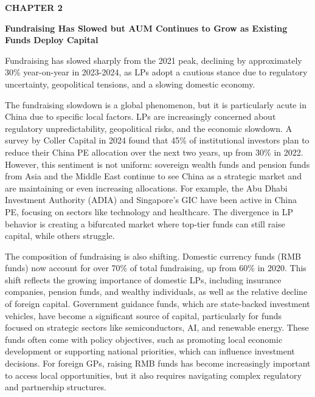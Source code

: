 \documentclass[10pt,a4paper]{article}
\begin{document}
\clearpage
\label{chap:2}
{\textcolor{BOBlue}{\scriptsize\bfseries CHAPTER 2}}\par\vspace{-1pt}
{\Large\sffamily\bfseries\color{BONavy} Fundraising Has Slowed but AUM Continues to Grow as Existing Funds Deploy Capital}\par\vspace{4pt}
{\textcolor{BOBlue}{\normalsize Fundraising has slowed sharply from the 2021 peak, declining by approximately 30\% year-on-year in 2023-2024, as LPs adopt a cautious stance due to regulatory uncertainty, geopolitical tensions, and a slowing domestic economy.}}\par\vspace{3pt}
\begin{minipage}[t]{0.58\linewidth}
{\small The fundraising slowdown is a global phenomenon, but it is particularly acute in China due to specific local factors. LPs are increasingly concerned about regulatory unpredictability, geopolitical risks, and the economic slowdown. A survey by Coller Capital in 2024 found that 45\% of institutional investors plan to reduce their China PE allocation over the next two years, up from 30\% in 2022. However, this sentiment is not uniform: sovereign wealth funds and pension funds from Asia and the Middle East continue to see China as a strategic market and are maintaining or even increasing allocations. For example, the Abu Dhabi Investment Authority (ADIA) and Singapore's GIC have been active in China PE, focusing on sectors like technology and healthcare. The divergence in LP behavior is creating a bifurcated market where top-tier funds can still raise capital, while others struggle.}\par
{\small The composition of fundraising is also shifting. Domestic currency funds (RMB funds) now account for over 70\% of total fundraising, up from 60\% in 2020. This shift reflects the growing importance of domestic LPs, including insurance companies, pension funds, and wealthy individuals, as well as the relative decline of foreign capital. Government guidance funds, which are state-backed investment vehicles, have become a significant source of capital, particularly for funds focused on strategic sectors like semiconductors, AI, and renewable energy. These funds often come with policy objectives, such as promoting local economic development or supporting national priorities, which can influence investment decisions. For foreign GPs, raising RMB funds has become increasingly important to access local opportunities, but it also requires navigating complex regulatory and partnership structures.}\par

\end{minipage}
\end{document}
